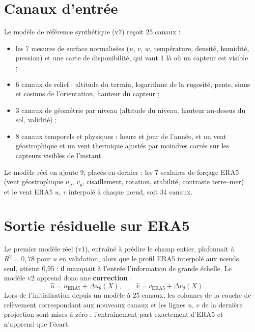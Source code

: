 \section{Canaux d'entrée}
Le modèle de référence synthétique (v7) reçoit 25 canaux :
\begin{itemize}
  \item les 7 mesures de surface normalisées ($u$, $v$, $w$, température, densité, humidité,
        pression) et une carte de disponibilité, qui vaut 1 là où un capteur est visible ;
  \item 6 canaux de relief : altitude du terrain, logarithme de la rugosité, pente, sinus et
        cosinus de l'orientation, hauteur du capteur ;
  \item 3 canaux de géométrie par niveau (altitude du niveau, hauteur au-dessus du sol, validité) ;
  \item 8 canaux temporels et physiques : heure et jour de l'année, et un vent géostrophique et un
        vent thermique ajustés par moindres carrés sur les capteurs visibles de l'instant.
\end{itemize}
Le modèle réel en ajoute 9, placés en dernier : les 7 scalaires de forçage ERA5 (vent géostrophique
$u_g$, $v_g$, cisaillement, rotation, stabilité, contraste terre--mer) et le vent ERA5 $u$, $v$
interpolé à chaque nœud, soit 34 canaux.

\section{Sortie résiduelle sur ERA5}
Le premier modèle réel (v1), entraîné à prédire le champ entier, plafonnait à $R^2 = 0{,}78$ pour
$u$ en validation, alors que le profil ERA5 interpolé aux nœuds, seul, atteint 0,95 : il manquait à
l'entrée l'information de grande échelle. Le modèle v2 apprend donc une \textbf{correction} :
\begin{equation}
  \hat u = u_{\mathrm{ERA5}} + \Delta u_\theta(X), \qquad
  \hat v = v_{\mathrm{ERA5}} + \Delta v_\theta(X).
\end{equation}
Lors de l'initialisation depuis un modèle à 25 canaux, les colonnes de la couche de relèvement
correspondant aux nouveaux canaux et les lignes $u$, $v$ de la dernière projection sont mises à
zéro : l'entraînement part exactement d'ERA5 et n'apprend que l'écart.

